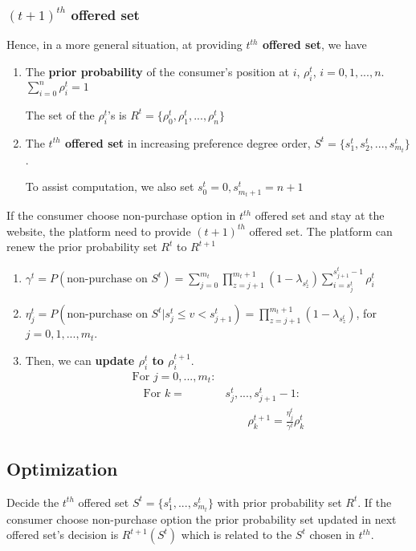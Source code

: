 \documentclass[11pt,a4paper]{article}
\begin{document}
\subsubsection*{${(t+1)}^{th}$ offered set}
Hence, in a more general situation, at providing \textbf{$t^{th}$ offered set}, we have
\begin{enumerate}[$\bullet$]
    \item The \textbf{prior probability} of the consumer's position at $i$, $\rho_i^t$, $i=0,1,...,n$. $\sum_{i=0}^n\rho_i^t=1$
    
    The set of the $\rho_i^t$'s is $R^t=\{\rho_0^t,\rho_1^t,...,\rho_n^t\}$
    \item The \textbf{$t^{th}$ offered set} in increasing preference degree order, $S^t=\{s_1^t,s_2^t,...,s_{m_t}^t\}$.
    
    To assist computation, we also set $s_0^t=0,s_{m_t+1}^t=n+1$
\end{enumerate}

If the consumer choose non-purchase option in $t^{th}$ offered set and stay at the website, the platform need to provide ${(t+1)}^{th}$ offered set. The platform can renew the prior probability set $R^t$ to $R^{t+1}$
\begin{enumerate}[(1)]
    \item $\gamma^t=P(\text{non-purchase on }S^t)=\sum_{j=0}^{m_t} \prod_{z=j+1}^{{m_t}+1}(1-\lambda_{s_{z}^t})\sum_{i=s_j^t}^{s_{j+1}^t-1}\rho_i^t$
    \item $\eta_j^t=P(\text{non-purchase on }S^t\vert s_{j}^t\leq v< s_{j+1}^t)=\prod_{z=j+1}^{m_t+1}(1-\lambda_{s_{z}^t})$, for $j=0,1,...,{m_t}$.
    \item Then, we can \textbf{update $\rho_i^t$ to $\rho_i^{t+1}$}.
    \begin{align*}
        \text{For }j=0,...,m_t:&\\
        \quad \text{For }k=&s_j^t,...,s_{j+1}^t-1:\\
        &\quad \quad \rho_{k}^{t+1}=\frac{\eta_j^t}{\gamma^t}\rho_k^t
    \end{align*}
\end{enumerate}

\subsection{Optimization}
Decide the $t^{th}$ offered set $S^t=\{s_1^t,...,s_{m_t}^t\}$ with prior probability set $R^t$. If the consumer choose non-purchase option the prior probability set updated in next offered set's decision is $R^{t+1}(S^t)$ which is related to the $S^t$ chosen in $t^{th}$.
\end{document}
